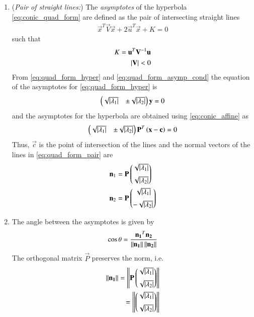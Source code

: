 \begin{enumerate}[label=\thesubsection.\arabic*.,ref=\thesubsection.\theenumi]
\item ({\em Pair of straight lines:}) The {\em asymptotes} of the hyperbola \eqref{eq:conic_quad_form} are defined as the pair of intersecting straight lines 
\begin{align}
\label{eq:asymp_quad_form}
\vec{x}^T\vec{V}\vec{x}+2\vec{u}^T\vec{x}+K=0
\end{align}
such that 
\begin{align} 
\label{eq:quad_form_asymp_cond}
K =  \mathbf{u}^T\mathbf{V}^{-1}\mathbf{u}
\\
\left\vert\mathbf{V}\right\vert < 0
\label{eq:quad_pair_det}
\end{align} 
%
From \eqref{eq:quad_form_hyper} and \eqref{eq:quad_form_asymp_cond} the equation of the asymptotes for \eqref{eq:quad_form_hyper} is
\begin{align} 
\begin{pmatrix}\sqrt{\left\vert\lambda_1\right\vert} & \pm \sqrt{\left\vert\lambda_2\right\vert}\end{pmatrix}\mathbf{y} = 0
\end{align} 
%
and the asymptotes for the hyperbola are obtained using \eqref{eq:conic_affine} as
%
\begin{align} 
\label{eq:quad_form_pair}
\begin{pmatrix}\sqrt{\left\vert\lambda_1\right\vert} & \pm \sqrt{\left\vert\lambda_2\right\vert}\end{pmatrix}\mathbf{P}^T\left(\mathbf{x}-\mathbf{c}\right) = 0
\end{align} 
%
Thus, $\vec{c}$ is the point of intersection of the lines and the normal vectors of the lines in \eqref{eq:quad_form_pair} are 
\begin{align} 
\label{eq:quad_form_pair_normvecs}
\begin{split}
\mathbf{n}_1 &= \mathbf{P}\begin{pmatrix}\sqrt{\left\vert\lambda_1\right\vert} \\[2mm]  \sqrt{\left\vert\lambda_2\right\vert}\end{pmatrix}
\\
\mathbf{n}_2 &= \mathbf{P}\begin{pmatrix}\sqrt{\left\vert\lambda_1\right\vert} \\[2mm] - \sqrt{\left\vert\lambda_2\right\vert}\end{pmatrix}
\end{split}
\end{align} 
%
\item The angle between the asymptotes is given by 
\begin{align} 
\label{eq:quad_form_pair_ang_exp}
\cos\theta=\frac{\mathbf{n_1}^T\mathbf{n_2}}{\left\lVert\mathbf{n_1}\right\rVert\left\lVert\mathbf{n_2}\right\rVert}
\end{align} 
The orthogonal matrix $\vec{P}$ preserves the norm, i.e.
\begin{align} 
\norm{\vec{n_1}} = \norm{\vec{P}\myvec{\sqrt{\abs{\lambda_1}} \\[2mm]  \sqrt{\abs{\lambda_2}}}}
\\
=\norm{\myvec{\sqrt{\abs{\lambda_1}} \\[2mm]  \sqrt{\abs{\lambda_2}}}}

\end{align}
\end{enumerate}
